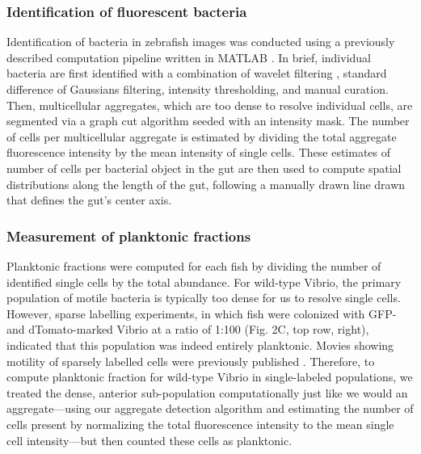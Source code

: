 \subsubsection{Identification of fluorescent bacteria}
Identification of bacteria in zebrafish images was conducted using a previously described computation pipeline written in MATLAB \cite{schlomann_bacterial_2018,jemielita_spatial_2014}. In brief, individual bacteria are first identified with a combination of wavelet filtering \cite{olivo-marin_extraction_2002}, standard difference of Gaussians filtering, intensity thresholding, and manual curation. Then, multicellular aggregates, which are too dense to resolve individual cells, are segmented via a graph cut algorithm \cite{boykov_experimental_2004} seeded with an intensity mask. The number of cells per multicellular aggregate is estimated by dividing the total aggregate fluorescence intensity by the mean intensity of single cells. These estimates of number of cells per bacterial object in the gut are then used to compute spatial distributions along the length of the gut, following a manually drawn line drawn that defines the gut's center axis.

\subsubsection{Measurement of planktonic fractions}
Planktonic fractions were computed for each fish by dividing the number of identified single cells by the total abundance. For wild-type Vibrio, the primary population of motile bacteria is typically too dense for us to resolve single cells. However, sparse labelling experiments, in which fish were colonized with GFP- and dTomato-marked Vibrio at a ratio of 1:100 (Fig. 2C, top row, right), indicated that this population was indeed entirely planktonic. Movies showing motility of sparsely labelled cells were previously published \cite{wiles_modernized_2018,schlomann_bacterial_2018}. Therefore, to compute planktonic fraction for wild-type Vibrio in single-labeled populations, we treated the dense, anterior sub-population computationally just like we would an aggregate—using our aggregate detection algorithm and estimating the number of cells present by normalizing the total fluorescence intensity to the mean single cell intensity—but then counted these cells as planktonic.

